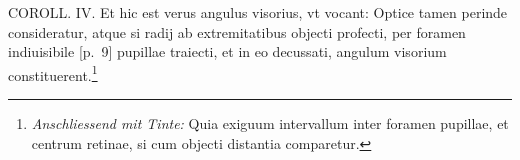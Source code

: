   \pend \vspace{2.0ex} \pstart \centering [p.~8] COROLL. IV.  \pend \vspace{1.0ex}\pstart Et hic est verus angulus visorius\protect{}, vt vocant: Optice tamen perinde consideratur, atque si radij\protect{} ab extremitatibus objecti profecti, per foramen indiuisibile [p.~9] pupillae\protect{} traiecti, et in eo decussati, angulum visorium\protect{} constituerent.\footnote{\textit{Anschliessend mit Tinte:} Quia exiguum intervallum inter foramen pupillae\protect{}, et centrum retinae, si cum objecti distantia comparetur.}